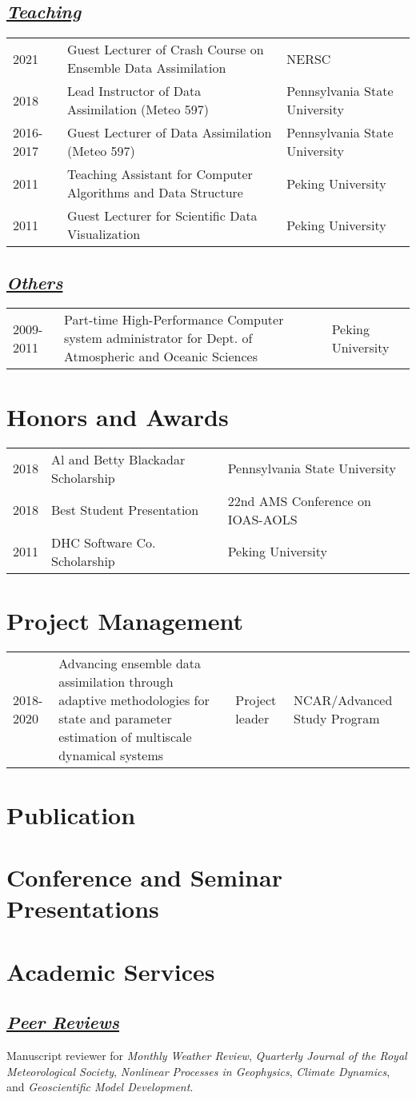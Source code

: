 \documentclass{article}
\newcommand{\cvsection}[1]{\section*{\bfseries#1}}
\newcommand{\cvsubsection}[1]{\subsection*{\itshape\uline{#1}}}
\begin{document}
\cvsubsection{Teaching}
\begin{tabular}{l p{9cm} l}
    2021 & Guest Lecturer of Crash Course on Ensemble Data Assimilation & NERSC \\
    2018 & Lead Instructor of Data Assimilation (Meteo 597) & Pennsylvania State University \\
    2016-2017 & Guest Lecturer of Data Assimilation (Meteo 597) & Pennsylvania State University \\
    2011 & Teaching Assistant for Computer Algorithms and Data Structure & Peking University \\
    2011 & Guest Lecturer for Scientific Data Visualization & Peking University \\
\end{tabular}

\cvsubsection{Others}
\begin{tabular}{l p{9cm} l}
    2009-2011 & Part-time High-Performance Computer system administrator for Dept. of Atmospheric and Oceanic Sciences & Peking University \\
\end{tabular}

\cvsection{Honors and Awards}
\begin{tabular}{l l l}
    2018 & Al and Betty Blackadar Scholarship & Pennsylvania State University \\
    2018 & Best Student Presentation & 22nd AMS Conference on IOAS-AOLS \\
    2011 & DHC Software Co. Scholarship & Peking University \\
\end{tabular}


\cvsection{Project Management}
\begin{tabular}{l p{8cm} p{2cm} p{3cm}}
    2018-2020 & Advancing ensemble data assimilation through adaptive methodologies for state and parameter estimation of multiscale dynamical systems & Project leader & NCAR/Advanced Study Program \\
\end{tabular}


\cvsection{Publication}


\cvsection{Conference and Seminar Presentations}


\cvsection{Academic Services}
\cvsubsection{Peer Reviews}
Manuscript reviewer for
\textit{Monthly Weather Review},
\textit{Quarterly Journal of the Royal Meteorological Society},
\textit{Nonlinear Processes in Geophysics},
\textit{Climate Dynamics},
and
\textit{Geoscientific Model Development}.
\end{document}
